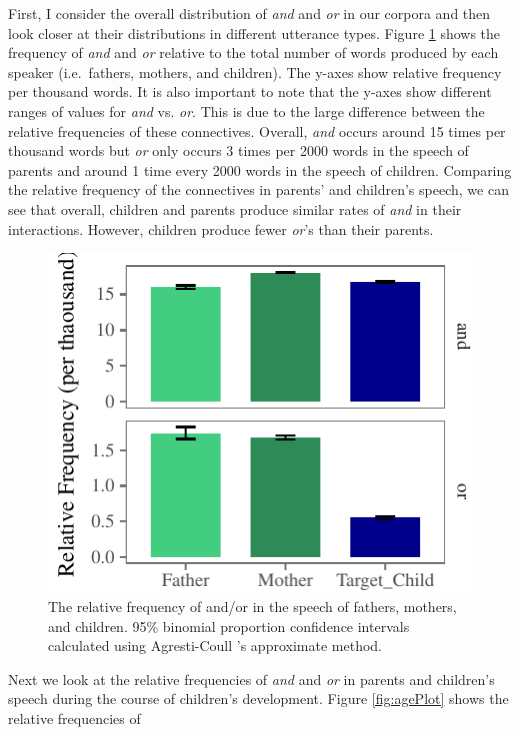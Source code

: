 \documentclass[oneside]{report}
\theoremstyle{definition}
\theoremstyle{definition}
\theoremstyle{definition}
\theoremstyle{remark}
\begin{document}
First, I consider the overall distribution of \emph{and} and \emph{or}
in our corpora and then look closer at their distributions in different
utterance types. Figure \ref{fig:freqTableBySpeakerPlot} shows the
frequency of \emph{and} and \emph{or} relative to the total number of
words produced by each speaker (i.e.~fathers, mothers, and children).
The y-axes show relative frequency per thousand words. It is also
important to note that the y-axes show different ranges of values for
\emph{and} vs. \emph{or}. This is due to the large difference between
the relative frequencies of these connectives. Overall, \emph{and}
occurs around 15 times per thousand words but \emph{or} only occurs 3
times per 2000 words in the speech of parents and around 1 time every
2000 words in the speech of children. Comparing the relative frequency
of the connectives in parents' and children's speech, we can see that
overall, children and parents produce similar rates of \emph{and} in
their interactions. However, children produce fewer \emph{or}'s than
their parents.
\begin{figure}[tb]

{\centering \includegraphics{figs/freqTableBySpeakerPlot-1} 

}

\caption{The relative frequency of and/or in the speech of fathers, mothers, and children. 95\% binomial proportion confidence intervals calculated using Agresti-Coull 's approximate method.}\label{fig:freqTableBySpeakerPlot}
\end{figure}
Next we look at the relative frequencies of \emph{and} and \emph{or} in
parents and children's speech during the course of children's
development. Figure \ref{fig:agePlot} shows the relative frequencies of
\end{document}

